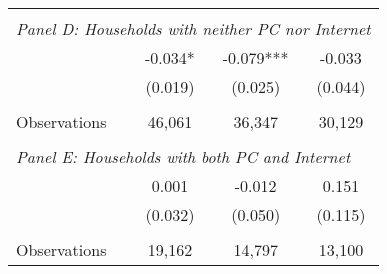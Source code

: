 {\begin{tabular}{lccc}
&  &  &   \\
\multicolumn{4}{l}{\textit{Panel D: Households with neither PC nor Internet}} \\
\hspace{3mm}        &      -0.034*  &      -0.079***&      -0.033   \\
                    &     (0.019)   &     (0.025)   &     (0.044)   \\
                    &               &               &               \\
\hspace{3mm}Observations&      46,061   &      36,347   &      30,129   \\
 
&  &  &   \\
\multicolumn{4}{l}{\textit{Panel E: Households with both PC and Internet}} \\
\hspace{3mm}        &       0.001   &      -0.012   &       0.151   \\
                    &     (0.032)   &     (0.050)   &     (0.115)   \\
                    &               &               &               \\
\hspace{3mm}Observations&      19,162   &      14,797   &      13,100   \\
 

\bottomrule
\end{tabular}
}
